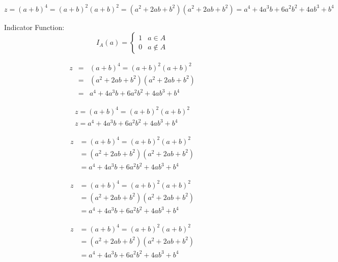 \documentclass{book}
\begin{document}
\[ z=(a+b)^4 = (a+b)^2(a+b)^2 = (a^2 + 2ab + b^2)(a^2 + 2ab + b^2) = a^4 + 4a^3b+6a^2b^2+4ab^3+b^4\]


Indicator Function:
\[I_A(a) = \begin{cases}
        1&a \in A\\
        0&a \not\in A
\end{cases}\]


\begin{eqnarray}
    z&=&(a+b)^4 = (a+b)^2(a+b)^2\\
     &=& (a^2 + 2ab + b^2)(a^2 + 2ab + b^2)\\
     &=& a^4 + 4a^3b+6a^2b^2+4ab^3+b^4
\end{eqnarray}




\begin{equation}
\begin{gathered}
    z=(a+b)^4 = (a+b)^2(a+b)^2\\
    z= a^4 + 4a^3b+6a^2b^2+4ab^3+b^4
\end{gathered}
\end{equation}

\begin{align}
    z&=(a+b)^4 = (a+b)^2(a+b)^2\nonumber\\
     &= (a^2 + 2ab + b^2)(a^2 + 2ab + b^2)\nonumber \\
     &= a^4 + 4a^3b+6a^2b^2+4ab^3+b^4
\end{align}

\begin{align}
    z&=(a+b)^4 = (a+b)^2(a+b)^2\\
     &= (a^2 + 2ab + b^2)(a^2 + 2ab + b^2)\\
     &= a^4 + 4a^3b+6a^2b^2+4ab^3+b^4
\end{align}




\begin{equation}
\begin{split}
    z&=(a+b)^4 = (a+b)^2(a+b)^2\\
     &= (a^2 + 2ab + b^2)(a^2 + 2ab + b^2) \\
     &= a^4 + 4a^3b+6a^2b^2+4ab^3+b^4
\end{split}
\end{equation}
\end{document}
